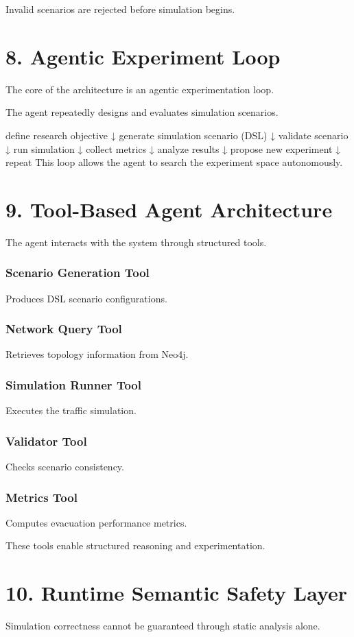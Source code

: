 Invalid scenarios are rejected before simulation begins.

\chapter*{8. Agentic Experiment Loop}
The core of the architecture is an agentic experimentation loop.

The agent repeatedly designs and evaluates simulation scenarios.

define research objective
↓
generate simulation scenario (DSL)
↓
validate scenario
↓
run simulation
↓
collect metrics
↓
analyze results
↓
propose new experiment
↓
repeat
This loop allows the agent to search the experiment space autonomously.

\chapter*{9. Tool-Based Agent Architecture}
The agent interacts with the system through structured tools.

\subsection*{Scenario Generation Tool}
Produces DSL scenario configurations.

\subsection*{Network Query Tool}
Retrieves topology information from Neo4j.

\subsection*{Simulation Runner Tool}
Executes the traffic simulation.

\subsection*{Validator Tool}
Checks scenario consistency.

\subsection*{Metrics Tool}
Computes evacuation performance metrics.

These tools enable structured reasoning and experimentation.

\chapter*{10. Runtime Semantic Safety Layer}
Simulation correctness cannot be guaranteed through static analysis alone.

